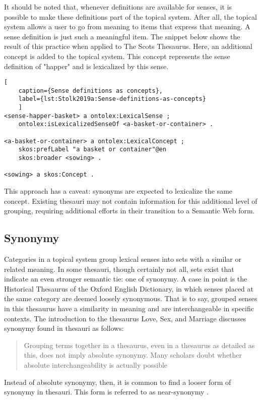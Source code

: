 It should be noted that, whenever definitions are available for senses, it is possible to make these definitions part of the topical system. 
After all, the topical system allows a user to go from meaning to items that express that meaning. 
A sense definition is just such a meaningful item. 
The snippet below shows the result of this practice when applied to The Scots Thesaurus. 
Here, an additional concept is added to the topical system. 
This concept represents the sense definition of "happer" and is lexicalized by this sense. 

\noindent
\begin{minipage}[c]{\textwidth}
	\begin{lstlisting}[
	caption={Sense definitions as concepts},
	label={lst:Stolk2019a:Sense-definitions-as-concepts}
	]
<sense-happer-basket> a ontolex:LexicalSense ;
	ontolex:isLexicalizedSenseOf <a-basket-or-container> .

<a-basket-or-container> a ontolex:LexicalConcept ;
	skos:prefLabel "a basket or container"@en 
	skos:broader <sowing> .

<sowing> a skos:Concept .
	\end{lstlisting}
\end{minipage}

This approach has a caveat: synonyms are expected to lexicalize the same concept. 
Existing thesauri may not contain information for this additional level of grouping, requiring additional efforts in their transition to a Semantic Web form.


\subsection{Synonymy}

Categories in a topical system group lexical senses into sets with a similar or related meaning. 
In some thesauri, though certainly not all, sets exist that indicate an even stronger semantic tie: one of synonymy. 
A case in point is the Historical Thesaurus of the Oxford English Dictionary, in which senses placed at the same category are deemed loosely synonymous. 
That is to say, grouped senses in this thesaurus have a similarity in meaning and are interchangeable in specific contexts. 
The introduction to the thesaurus Love, Sex, and Marriage discusses synonymy found in thesauri as follows: \cite{ref-LSM}
\begin{quotation}
\noindent
Grouping terms together in a thesaurus, even in a thesaurus as detailed as this, does not imply absolute synonymy. Many scholars doubt whether absolute interchangeability is actually possible
\end{quotation}
Instead of absolute synonymy, then, it is common to find a looser form of synonymy in thesauri. This form is referred to as near-synonymy \cite{murphy_meaning_2016}. 

